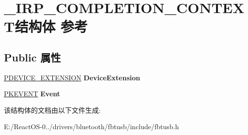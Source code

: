 \hypertarget{struct___i_r_p___c_o_m_p_l_e_t_i_o_n___c_o_n_t_e_x_t}{}\section{\+\_\+\+I\+R\+P\+\_\+\+C\+O\+M\+P\+L\+E\+T\+I\+O\+N\+\_\+\+C\+O\+N\+T\+E\+X\+T结构体 参考}
\label{struct___i_r_p___c_o_m_p_l_e_t_i_o_n___c_o_n_t_e_x_t}
\subsection*{Public 属性}
\begin{DoxyCompactItemize}
\item 
\mbox{\label{struct___i_r_p___c_o_m_p_l_e_t_i_o_n___c_o_n_t_e_x_t_ae721af615d8fa0028ecdcf4908462769}} 
\hyperlink{struct___b_e_e_p___d_e_v_i_c_e___e_x_t_e_n_s_i_o_n}{P\+D\+E\+V\+I\+C\+E\+\_\+\+E\+X\+T\+E\+N\+S\+I\+ON} {\bfseries Device\+Extension}
\item 
\mbox{\label{struct___i_r_p___c_o_m_p_l_e_t_i_o_n___c_o_n_t_e_x_t_a172e9e4f5ab98907d6ab057f888bcd86}} 
\hyperlink{struct___k_e_v_e_n_t}{P\+K\+E\+V\+E\+NT} {\bfseries Event}
\end{DoxyCompactItemize}


该结构体的文档由以下文件生成\+:\begin{DoxyCompactItemize}
\item 
E\+:/\+React\+O\+S-\/0../drivers/bluetooth/fbtusb/include/fbtusb.\+h\end{DoxyCompactItemize}
